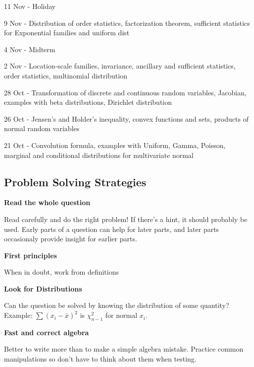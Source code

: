 \documentclass[10pt, twocolumn]{article}
\begin{document}
11 Nov - Holiday

9 Nov - Distribution of order statistics, factorization theorem, sufficient
statistics for Exponential families and uniform dist

4 Nov - Midterm

2 Nov - Location-scale families, invariance, ancillary and sufficient
statistics, order statistics, multinomial distribution

28 Oct - Transformation of discrete and continuous random variables,
Jacobian, examples with beta distributions, Dirichlet distribution

26 Oct - Jensen's and Holder's inequality, convex functions and sets,
products of normal random variables

21 Oct - Convolution formula, examples with Uniform, Gamma, Poisson,
marginal and conditional distributions for multivariate normal
\newpage

\subsection{Problem Solving Strategies}

\textbf{Read the whole question}

Read carefully and do the right problem! If there's a hint, it should
probably be used. Early parts of a question can help for later parts, and later
parts occasionaly provide insight for earlier parts.

\textbf{First principles}

When in doubt, work from definitions

\textbf{Look for Distributions} 

Can the question be solved by knowing the distribution of some
quantity?  Example: $\sum (x_i - \bar{x})^2$ is $\chi^2_{n-1}$ for
normal $x_i$.

\textbf{Fast and correct algebra}

Better to write more than to make a simple algebra mistake.
Practice common manipulations so don't have to think about them
when testing.
\end{document}
